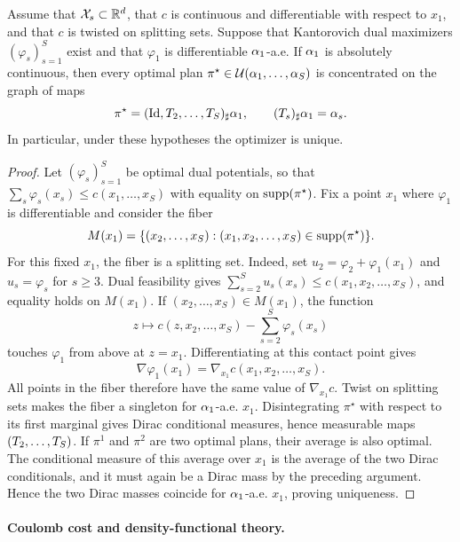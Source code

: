 \begin{prop}\label{prop-multimarginal-monge-structure}
	Assume that $\mathcal{X}_s\subset\mathbb{R}^d$, that $c$ is continuous and differentiable with respect to $x_1$, and that $c$ is twisted on splitting sets. Suppose that Kantorovich dual maximizers $(\varphi_s)_{s=1}^S$ exist and that $\varphi_1$ is differentiable $\alpha_1$-a.e. If $\alpha_1$ is absolutely continuous, then every optimal plan $\pi^\star\in\mathcal{U}(\alpha_1,\ldots,\alpha_S)$ is concentrated on the graph of maps
	\[
		\pi^\star=(\mathrm{Id},T_2,\ldots,T_S)_\sharp\alpha_1,
		\qquad
		(T_s)_\sharp\alpha_1=\alpha_s.
	\]
	In particular, under these hypotheses the optimizer is unique.
\end{prop}
\begin{proof}
	Let $(\varphi_s)_{s=1}^S$ be optimal dual potentials, so that $\sum_s\varphi_s(x_s)\leq c(x_1,\ldots,x_S)$ with equality on $\operatorname{supp}(\pi^\star)$. Fix a point $x_1$ where $\varphi_1$ is differentiable and consider the fiber
	\[
		M(x_1)=\{(x_2,\ldots,x_S):(x_1,x_2,\ldots,x_S)\in\operatorname{supp}(\pi^\star)\}.
	\]
	For this fixed $x_1$, the fiber is a splitting set. Indeed, set $u_2=\varphi_2+\varphi_1(x_1)$ and $u_s=\varphi_s$ for $s\geq3$. Dual feasibility gives $\sum_{s=2}^S u_s(x_s)\leq c(x_1,x_2,\ldots,x_S)$, and equality holds on $M(x_1)$. If $(x_2,\ldots,x_S)\in M(x_1)$, the function
	\[
		z\longmapsto c(z,x_2,\ldots,x_S)-\sum_{s=2}^S\varphi_s(x_s)
	\]
	touches $\varphi_1$ from above at $z=x_1$. Differentiating at this contact point gives
	\[
		\nabla\varphi_1(x_1)=\nabla_{x_1}c(x_1,x_2,\ldots,x_S).
	\]
	All points in the fiber therefore have the same value of $\nabla_{x_1}c$. Twist on splitting sets makes the fiber a singleton for $\alpha_1$-a.e. $x_1$. Disintegrating $\pi^\star$ with respect to its first marginal gives Dirac conditional measures, hence measurable maps $(T_2,\ldots,T_S)$. If $\pi^1$ and $\pi^2$ are two optimal plans, their average is also optimal. The conditional measure of this average over $x_1$ is the average of the two Dirac conditionals, and it must again be a Dirac mass by the preceding argument. Hence the two Dirac masses coincide for $\alpha_1$-a.e. $x_1$, proving uniqueness.
\end{proof}

\paragraph{Coulomb cost and density-functional theory.}

